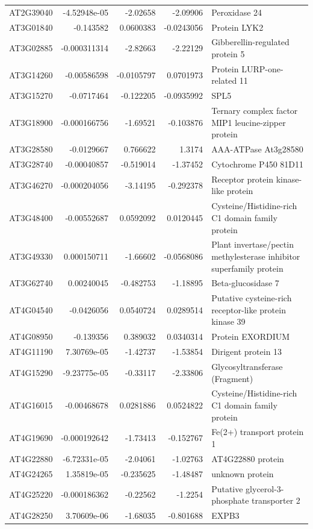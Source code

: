 \documentclass[11pt]{article}
\begin{document}
\begin{center}
\begin{tabular}{lrrrl}
AT2G39040 & -4.52948e-05 & -2.02658 & -2.09906 & Peroxidase 24\\
AT3G01840 & -0.143582 & 0.0600383 & -0.0243056 & Protein LYK2\\
AT3G02885 & -0.000311314 & -2.82663 & -2.22129 & Gibberellin-regulated protein 5\\
AT3G14260 & -0.00586598 & -0.0105797 & 0.0701973 & Protein LURP-one-related 11\\
AT3G15270 & -0.0717464 & -0.122205 & -0.0935992 & SPL5\\
AT3G18900 & -0.000166756 & -1.69521 & -0.103876 & Ternary complex factor MIP1 leucine-zipper protein\\
AT3G28580 & -0.0129667 & 0.766622 & 1.3174 & AAA-ATPase At3g28580\\
AT3G28740 & -0.00040857 & -0.519014 & -1.37452 & Cytochrome P450 81D11\\
AT3G46270 & -0.000204056 & -3.14195 & -0.292378 & Receptor protein kinase-like protein\\
AT3G48400 & -0.00552687 & 0.0592092 & 0.0120445 & Cysteine/Histidine-rich C1 domain family protein\\
AT3G49330 & 0.000150711 & -1.66602 & -0.0568086 & Plant invertase/pectin methylesterase inhibitor superfamily protein\\
AT3G62740 & 0.00240045 & -0.482753 & -1.18895 & Beta-glucosidase 7\\
AT4G04540 & -0.0426056 & 0.0540724 & 0.0289514 & Putative cysteine-rich receptor-like protein kinase 39\\
AT4G08950 & -0.139356 & 0.389032 & 0.0340314 & Protein EXORDIUM\\
AT4G11190 & 7.30769e-05 & -1.42737 & -1.53854 & Dirigent protein 13\\
AT4G15290 & -9.23775e-05 & -0.33117 & -2.33806 & Glycosyltransferase (Fragment)\\
AT4G16015 & -0.00468678 & 0.0281886 & 0.0524822 & Cysteine/Histidine-rich C1 domain family protein\\
AT4G19690 & -0.000192642 & -1.73413 & -0.152767 & Fe(2+) transport protein 1\\
AT4G22880 & -6.72331e-05 & -2.04061 & -1.02763 & AT4G22880 protein\\
AT4G24265 & 1.35819e-05 & -0.235625 & -1.48487 & unknown protein\\
AT4G25220 & -0.000186362 & -0.22562 & -1.2254 & Putative glycerol-3-phosphate transporter 2\\
AT4G28250 & 3.70609e-06 & -1.68035 & -0.801688 & EXPB3\\

\end{tabular}
\end{center}
\end{document}
